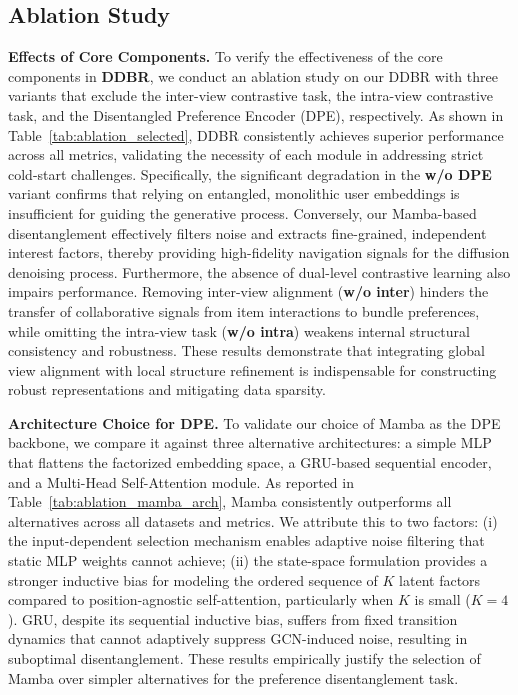 \documentclass[lettersize,journal]{IEEEtran}
\begin{document}
\subsection{Ablation Study}
\label{sec:ablation}
\noindent\textbf{Effects of Core Components.}
To verify the effectiveness of the core components in \textbf{DDBR}, we conduct an ablation study on our DDBR with three variants that exclude the inter-view contrastive task, the intra-view contrastive task, and the Disentangled Preference Encoder (DPE), respectively. As shown in Table~\ref{tab:ablation_selected}, DDBR consistently achieves superior performance across all metrics, validating the necessity of each module in addressing strict cold-start challenges. Specifically, the significant degradation in the \textbf{w/o DPE} variant confirms that relying on entangled, monolithic user embeddings is insufficient for guiding the generative process. Conversely, our Mamba-based disentanglement effectively filters noise and extracts fine-grained, independent interest factors, thereby providing high-fidelity navigation signals for the diffusion denoising process. Furthermore, the absence of dual-level contrastive learning also impairs performance. Removing inter-view alignment (\textbf{w/o inter}) hinders the transfer of collaborative signals from item interactions to bundle preferences, while omitting the intra-view task (\textbf{w/o intra}) weakens internal structural consistency and robustness. These results demonstrate that integrating global view alignment with local structure refinement is indispensable for constructing robust representations and mitigating data sparsity.


\noindent\textbf{Architecture Choice for DPE.}
To validate our choice of Mamba as the DPE backbone, we compare it against three alternative architectures: a simple MLP that flattens the factorized embedding space, a GRU-based sequential encoder, and a Multi-Head Self-Attention module. As reported in Table~\ref{tab:ablation_mamba_arch}, Mamba consistently outperforms all alternatives across all datasets and metrics. We attribute this to two factors: (i) the input-dependent selection mechanism enables adaptive noise filtering that static MLP weights cannot achieve; (ii) the state-space formulation provides a stronger inductive bias for modeling the ordered sequence of $K$ latent factors compared to position-agnostic self-attention, particularly when $K$ is small ($K=4$). GRU, despite its sequential inductive bias, suffers from fixed transition dynamics that cannot adaptively suppress GCN-induced noise, resulting in suboptimal disentanglement. These results empirically justify the selection of Mamba over simpler alternatives for the preference disentanglement task.
\end{document}
